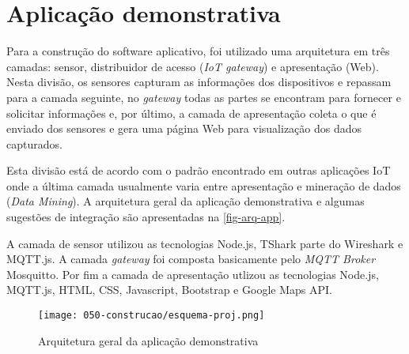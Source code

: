 \chapter{Aplicação demonstrativa}
\label{chap:aplicacao_demonstrativa}

Para a construção do software aplicativo, foi utilizado uma arquitetura em
três camadas: sensor, distribuidor de acesso (\emph{IoT gateway}) e apresentação
(Web). Nesta divisão, os sensores capturam as informações dos dispositivos
e repassam para a camada seguinte, no \emph{gateway} todas as partes se
encontram para fornecer e solicitar informações e, por último, a camada de
apresentação coleta o que é enviado dos sensores e gera uma página Web
para visualização dos dados capturados.

Esta divisão está de acordo com o padrão encontrado em outras aplicações
IoT onde a última camada usualmente varia entre apresentação e mineração
de dados (\emph{Data Mining}). A arquitetura geral da aplicação demonstrativa
e algumas sugestões de integração são apresentadas na \autoref{fig-arq-app}.

A camada de sensor utilizou as tecnologias Node.js, TShark parte
do Wireshark e MQTT.js. A camada \emph{gateway} foi composta
basicamente pelo \emph{MQTT Broker} Mosquitto. Por fim a camada de
apresentação utlizou as tecnologias Node.js, MQTT.js, HTML,
CSS, Javascript, Bootstrap e Google Maps API.

\begin{figure}[htb]
	\caption{\label{fig-arq-app}Arquitetura geral da aplicação demonstrativa}
	\begin{center}
		\texttt{[image: 050-construcao/esquema-proj.png]}
	\end{center}
\end{figure}
